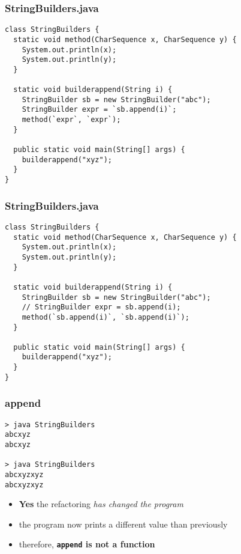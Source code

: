 \begin{frame}[fragile]
\frametitle{StringBuilders.java}
\begin{lstlisting}[style=java]
class StringBuilders {
  static void method(CharSequence x, CharSequence y) {
    System.out.println(x);
    System.out.println(y);
  }

  static void builderappend(String i) {
    StringBuilder sb = new StringBuilder("abc");
    StringBuilder expr = `sb.append(i)`;
    method(`expr`, `expr`);
  }

  public static void main(String[] args) {
    builderappend("xyz");
  }
}
\end{lstlisting}
\end{frame}

\begin{frame}[fragile]
\frametitle{StringBuilders.java}
\begin{lstlisting}[style=java]
class StringBuilders {
  static void method(CharSequence x, CharSequence y) {
    System.out.println(x);
    System.out.println(y);
  }

  static void builderappend(String i) {
    StringBuilder sb = new StringBuilder("abc");
    // StringBuilder expr = sb.append(i);
    method(`sb.append(i)`, `sb.append(i)`);
  }

  public static void main(String[] args) {
    builderappend("xyz");
  }
}
\end{lstlisting}
\end{frame}

\begin{frame}[fragile]
\frametitle{append}
\begin{block}{}
\begin{lstlisting}
> java StringBuilders
abcxyz
abcxyz

> java StringBuilders
abcxyzxyz
abcxyzxyz
\end{lstlisting}
\end{block}
\begin{itemize}
  \item<1> \textbf{Yes} the refactoring \emph{has changed the program}
  \item<2> the program now prints a different value than previously
  \item<3> therefore, \textbf{\lstinline$append$ is not a function}
\end{itemize}
\end{frame}
